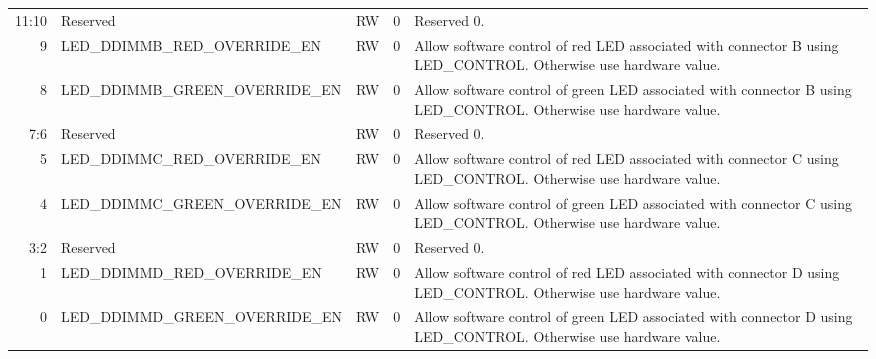 \begin{tabularx}{\textwidth}{r|l|l|l|X}
  11:10 & Reserved                         & RW   & 0     &

  Reserved 0. \\

  9     & LED\_DDIMMB\_RED\_OVERRIDE\_EN   & RW   & 0     &

  Allow software control of red LED associated with connector B using LED\_CONTROL. Otherwise use hardware value. \\

  8     & LED\_DDIMMB\_GREEN\_OVERRIDE\_EN & RW   & 0     &

  Allow software control of green LED associated with connector B using LED\_CONTROL. Otherwise use hardware value. \\

  7:6   & Reserved                         & RW   & 0     &

  Reserved 0. \\

  5     & LED\_DDIMMC\_RED\_OVERRIDE\_EN   & RW   & 0     &

  Allow software control of red LED associated with connector C using LED\_CONTROL. Otherwise use hardware value. \\

  4     & LED\_DDIMMC\_GREEN\_OVERRIDE\_EN & RW   & 0     &

  Allow software control of green LED associated with connector C using LED\_CONTROL. Otherwise use hardware value. \\

  3:2   & Reserved                         & RW   & 0     &

  Reserved 0. \\

  1     & LED\_DDIMMD\_RED\_OVERRIDE\_EN   & RW   & 0     &

  Allow software control of red LED associated with connector D using LED\_CONTROL. Otherwise use hardware value. \\

  0     & LED\_DDIMMD\_GREEN\_OVERRIDE\_EN & RW   & 0     &

  Allow software control of green LED associated with connector D using LED\_CONTROL. Otherwise use hardware value. \\
\end{tabularx}

